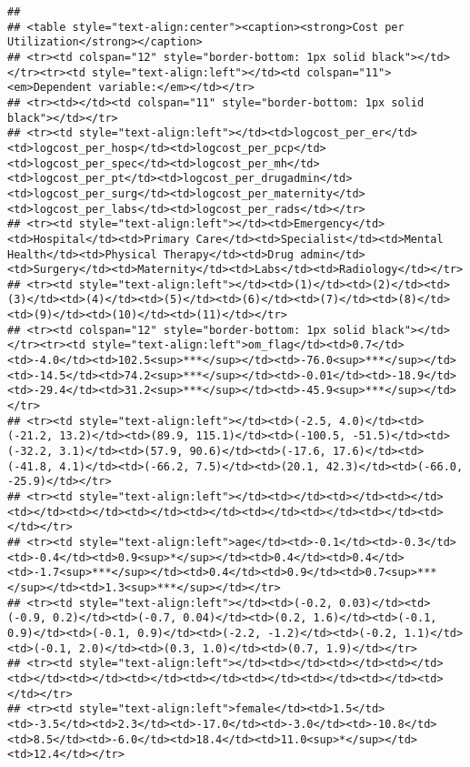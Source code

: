 \documentclass[]{article}
\begin{document}
\begin{verbatim}
## 
## <table style="text-align:center"><caption><strong>Cost per Utilization</strong></caption>
## <tr><td colspan="12" style="border-bottom: 1px solid black"></td></tr><tr><td style="text-align:left"></td><td colspan="11"><em>Dependent variable:</em></td></tr>
## <tr><td></td><td colspan="11" style="border-bottom: 1px solid black"></td></tr>
## <tr><td style="text-align:left"></td><td>logcost_per_er</td><td>logcost_per_hosp</td><td>logcost_per_pcp</td><td>logcost_per_spec</td><td>logcost_per_mh</td><td>logcost_per_pt</td><td>logcost_per_drugadmin</td><td>logcost_per_surg</td><td>logcost_per_maternity</td><td>logcost_per_labs</td><td>logcost_per_rads</td></tr>
## <tr><td style="text-align:left"></td><td>Emergency</td><td>Hospital</td><td>Primary Care</td><td>Specialist</td><td>Mental Health</td><td>Physical Therapy</td><td>Drug admin</td><td>Surgery</td><td>Maternity</td><td>Labs</td><td>Radiology</td></tr>
## <tr><td style="text-align:left"></td><td>(1)</td><td>(2)</td><td>(3)</td><td>(4)</td><td>(5)</td><td>(6)</td><td>(7)</td><td>(8)</td><td>(9)</td><td>(10)</td><td>(11)</td></tr>
## <tr><td colspan="12" style="border-bottom: 1px solid black"></td></tr><tr><td style="text-align:left">om_flag</td><td>0.7</td><td>-4.0</td><td>102.5<sup>***</sup></td><td>-76.0<sup>***</sup></td><td>-14.5</td><td>74.2<sup>***</sup></td><td>-0.01</td><td>-18.9</td><td>-29.4</td><td>31.2<sup>***</sup></td><td>-45.9<sup>***</sup></td></tr>
## <tr><td style="text-align:left"></td><td>(-2.5, 4.0)</td><td>(-21.2, 13.2)</td><td>(89.9, 115.1)</td><td>(-100.5, -51.5)</td><td>(-32.2, 3.1)</td><td>(57.9, 90.6)</td><td>(-17.6, 17.6)</td><td>(-41.8, 4.1)</td><td>(-66.2, 7.5)</td><td>(20.1, 42.3)</td><td>(-66.0, -25.9)</td></tr>
## <tr><td style="text-align:left"></td><td></td><td></td><td></td><td></td><td></td><td></td><td></td><td></td><td></td><td></td><td></td></tr>
## <tr><td style="text-align:left">age</td><td>-0.1</td><td>-0.3</td><td>-0.4</td><td>0.9<sup>*</sup></td><td>0.4</td><td>0.4</td><td>-1.7<sup>***</sup></td><td>0.4</td><td>0.9</td><td>0.7<sup>***</sup></td><td>1.3<sup>***</sup></td></tr>
## <tr><td style="text-align:left"></td><td>(-0.2, 0.03)</td><td>(-0.9, 0.2)</td><td>(-0.7, 0.04)</td><td>(0.2, 1.6)</td><td>(-0.1, 0.9)</td><td>(-0.1, 0.9)</td><td>(-2.2, -1.2)</td><td>(-0.2, 1.1)</td><td>(-0.1, 2.0)</td><td>(0.3, 1.0)</td><td>(0.7, 1.9)</td></tr>
## <tr><td style="text-align:left"></td><td></td><td></td><td></td><td></td><td></td><td></td><td></td><td></td><td></td><td></td><td></td></tr>
## <tr><td style="text-align:left">female</td><td>1.5</td><td>-3.5</td><td>2.3</td><td>-17.0</td><td>-3.0</td><td>-10.8</td><td>8.5</td><td>-6.0</td><td>18.4</td><td>11.0<sup>*</sup></td><td>12.4</td></tr>

\end{verbatim}
\end{document}
